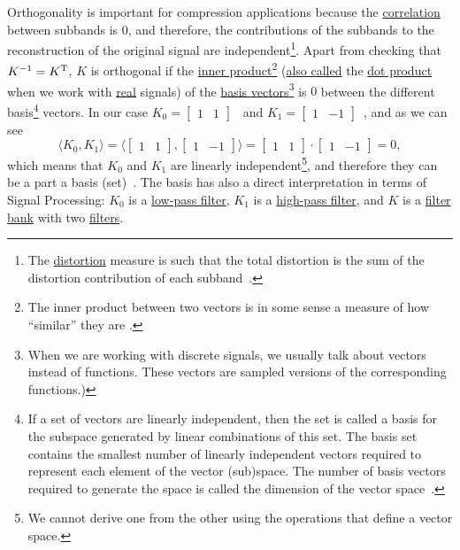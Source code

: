 Orthogonality is important for compression applications because the
\href{https://en.wikipedia.org/wiki/Correlation_and_dependence}{correlation}
between subbands is 0, and therefore, the contributions of the
subbands to the reconstruction of the original signal are
independent\footnote{The
  \href{https://en.wikipedia.org/wiki/Distortion}{distortion} measure
  is such that the total distortion is the sum of the distortion
  contribution of each subband~\cite{sayood2017introduction}.}. Apart
from checking that $K^{-1}=K^{\text T}$, $K$ is orthogonal if the
\href{https://en.wikipedia.org/wiki/Inner_product_space}{inner
  product}\footnote{The inner product between two vectors is in some
  sense a measure of how ``similar'' they are
  \cite{sayood2017introduction}.}
(\href{https://math.stackexchange.com/questions/476738/difference-between-dot-product-and-inner-product}{also
  called} the \href{https://en.wikipedia.org/wiki/Dot_product}{dot
  product} when we work with
\href{https://en.wikipedia.org/wiki/Real_number}{real} signals) of the
\href{https://en.wikipedia.org/wiki/Basis_(linear_algebra)}{basis
  vectors}\footnote{When we are working with discrete signals, we
  usually talk about vectors instead of functions. These vectors are
  sampled versions of the corresponding functions.)} is $0$ between
the different basis\footnote{If a set of vectors are linearly
  independent, then the set is called a basis for the subspace
  generated by linear combinations of this set. The basis set contains
  the smallest number of linearly independent vectors required to
  represent each element of the vector (sub)space. The number of basis
  vectors required to generate the space is called the dimension of
  the vector space~\cite{sayood2017introduction}.} vectors. In our
case $K_0=\begin{bmatrix}1 & 1\end{bmatrix}$~ and
$K_1=\begin{bmatrix} 1 & -1\end{bmatrix}$~, and as we can see
\begin{equation}
  \langle K_0,K_1 \rangle =
  \langle \begin{bmatrix}
    1 & 1
  \end{bmatrix}
  ,
  \begin{bmatrix}
    1 & -1
  \end{bmatrix}
  \rangle =
  \begin{bmatrix}
    1 & 1
  \end{bmatrix}
  \cdot
  \begin{bmatrix}
    1 & -1
  \end{bmatrix}
   = 0,
\end{equation}
which means that $K_0$ and $K_1$ are linearly independent\footnote{We
cannot derive one from the other using the operations that define a
vector space.}, and therefore they can be a part a basis
(set)~\cite{strang4linear}. The basis has also a direct interpretation
in terms of Signal Processing: $K_0$ is a
\href{https://en.wikipedia.org/wiki/Low-pass_filter}{low-pass filter},
$K_1$ is a
\href{https://en.wikipedia.org/wiki/High-pass_filter}{high-pass
  filter}, and $K$ is a
\href{https://en.wikipedia.org/wiki/Filter_bank}{filter bank} with two
\href{https://en.wikipedia.org/wiki/Digital_filter}{filters}.

